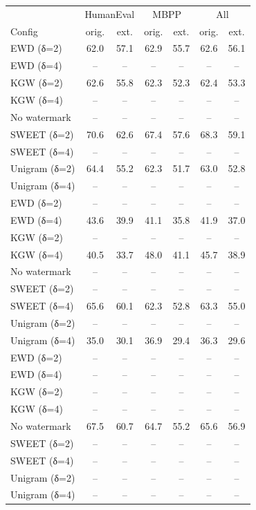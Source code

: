\begin{tabular}{lcccccc}
\toprule
 & \multicolumn{2}{c}{HumanEval} & \multicolumn{2}{c}{MBPP} & \multicolumn{2}{c}{All} \\
Config & orig. & ext. & orig. & ext. & orig. & ext. \\
\midrule
EWD (δ=2) & 62.0 & 57.1 & 62.9 & 55.7 & 62.6 & 56.1 \\
EWD (δ=4) & -- & -- & -- & -- & -- & -- \\
KGW (δ=2) & 62.6 & 55.8 & 62.3 & 52.3 & 62.4 & 53.3 \\
KGW (δ=4) & -- & -- & -- & -- & -- & -- \\
No watermark & -- & -- & -- & -- & -- & -- \\
SWEET (δ=2) & 70.6 & 62.6 & 67.4 & 57.6 & 68.3 & 59.1 \\
SWEET (δ=4) & -- & -- & -- & -- & -- & -- \\
Unigram (δ=2) & 64.4 & 55.2 & 62.3 & 51.7 & 63.0 & 52.8 \\
Unigram (δ=4) & -- & -- & -- & -- & -- & -- \\
EWD (δ=2) & -- & -- & -- & -- & -- & -- \\
EWD (δ=4) & 43.6 & 39.9 & 41.1 & 35.8 & 41.9 & 37.0 \\
KGW (δ=2) & -- & -- & -- & -- & -- & -- \\
KGW (δ=4) & 40.5 & 33.7 & 48.0 & 41.1 & 45.7 & 38.9 \\
No watermark & -- & -- & -- & -- & -- & -- \\
SWEET (δ=2) & -- & -- & -- & -- & -- & -- \\
SWEET (δ=4) & 65.6 & 60.1 & 62.3 & 52.8 & 63.3 & 55.0 \\
Unigram (δ=2) & -- & -- & -- & -- & -- & -- \\
Unigram (δ=4) & 35.0 & 30.1 & 36.9 & 29.4 & 36.3 & 29.6 \\
EWD (δ=2) & -- & -- & -- & -- & -- & -- \\
EWD (δ=4) & -- & -- & -- & -- & -- & -- \\
KGW (δ=2) & -- & -- & -- & -- & -- & -- \\
KGW (δ=4) & -- & -- & -- & -- & -- & -- \\
No watermark & 67.5 & 60.7 & 64.7 & 55.2 & 65.6 & 56.9 \\
SWEET (δ=2) & -- & -- & -- & -- & -- & -- \\
SWEET (δ=4) & -- & -- & -- & -- & -- & -- \\
Unigram (δ=2) & -- & -- & -- & -- & -- & -- \\
Unigram (δ=4) & -- & -- & -- & -- & -- & -- \\
\bottomrule
\end{tabular}